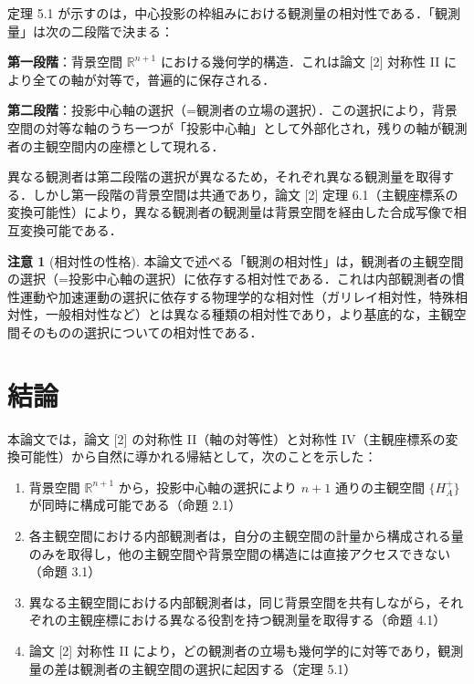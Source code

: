 \documentclass[a4paper,11pt]{ltjsarticle}
\theoremstyle{definition}
\newtheorem{remark}[theorem]{注意}
\begin{document}
定理 5.1 が示すのは，中心投影の枠組みにおける観測量の相対性である．「観測量」は次の二段階で決まる：

\textbf{第一段階}：背景空間 \(\mathbb{R}^{n+1}\) における幾何学的構造．これは論文 {[2]} 対称性 II により全ての軸が対等で，普遍的に保存される．

\textbf{第二段階}：投影中心軸の選択（=観測者の立場の選択）．この選択により，背景空間の対等な軸のうち一つが「投影中心軸」として外部化され，残りの軸が観測者の主観空間内の座標として現れる．

異なる観測者は第二段階の選択が異なるため，それぞれ異なる観測量を取得する．しかし第一段階の背景空間は共通であり，論文 {[2]} 定理 6.1（主観座標系の変換可能性）により，異なる観測者の観測量は背景空間を経由した合成写像で相互変換可能である．

\begin{remark}[相対性の性格]
本論文で述べる「観測の相対性」は，観測者の主観空間の選択（=投影中心軸の選択）に依存する相対性である．これは内部観測者の慣性運動や加速運動の選択に依存する物理学的な相対性（ガリレイ相対性，特殊相対性，一般相対性など）とは異なる種類の相対性であり，より基底的な，主観空間そのものの選択についての相対性である．
\end{remark}

\section{結論}

本論文では，論文 {[2]} の対称性 II（軸の対等性）と対称性 IV（主観座標系の変換可能性）から自然に導かれる帰結として，次のことを示した：

\begin{enumerate}
\item 背景空間 \(\mathbb{R}^{n+1}\) から，投影中心軸の選択により \(n+1\) 通りの主観空間 \(\{H_A^+\}\) が同時に構成可能である（命題 2.1）

\item 各主観空間における内部観測者は，自分の主観空間の計量から構成される量のみを取得し，他の主観空間や背景空間の構造には直接アクセスできない（命題 3.1）

\item 異なる主観空間における内部観測者は，同じ背景空間を共有しながら，それぞれの主観座標における異なる役割を持つ観測量を取得する（命題 4.1）

\item 論文 {[2]} 対称性 II により，どの観測者の立場も幾何学的に対等であり，観測量の差は観測者の主観空間の選択に起因する（定理 5.1）
\end{enumerate}
\end{document}
